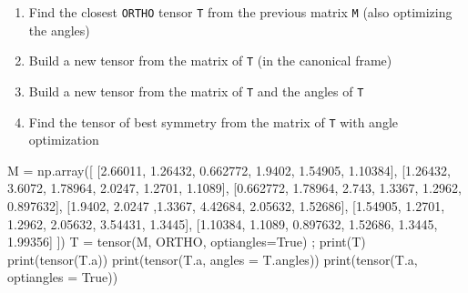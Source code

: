 \documentclass[
  letterpaper,
  DIV=11,
  numbers=noendperiod]{scrreprt}
\newenvironment{Shaded}{\begin{snugshade}}{\end{snugshade}}
\newcommand{\BuiltInTok}[1]{\textcolor[rgb]{0.00,0.23,0.31}{#1}}
\newcommand{\FloatTok}[1]{\textcolor[rgb]{0.68,0.00,0.00}{#1}}
\newcommand{\NormalTok}[1]{\textcolor[rgb]{0.00,0.23,0.31}{#1}}
\newcommand{\OperatorTok}[1]{\textcolor[rgb]{0.37,0.37,0.37}{#1}}
\newcommand{\VariableTok}[1]{\textcolor[rgb]{0.07,0.07,0.07}{#1}}
\begin{document}
\begin{tcolorbox}[enhanced jigsaw, left=2mm, bottomrule=.15mm, colbacktitle=quarto-callout-caution-color!10!white, colback=white, colframe=quarto-callout-caution-color-frame, rightrule=.15mm, bottomtitle=1mm, toptitle=1mm, titlerule=0mm, title={Exercise}, toprule=.15mm, arc=.35mm, opacityback=0, opacitybacktitle=0.6, leftrule=.75mm, breakable, coltitle=black]

\begin{enumerate}
\def\labelenumi{\arabic{enumi}.}
\item
  Find the closest \texttt{ORTHO} tensor \texttt{T} from the previous
  matrix \texttt{M} (also optimizing the angles)
\item
  Build a new tensor from the matrix of \texttt{T} (in the canonical
  frame)
\item
  Build a new tensor from the matrix of \texttt{T} and the angles of
  \texttt{T}
\item
  Find the tensor of best symmetry from the matrix of \texttt{T} with
  angle optimization
\end{enumerate}

\begin{Shaded}
\begin{Highlighting}[]
\NormalTok{M }\OperatorTok{=}\NormalTok{ np.array([ [}\FloatTok{2.66011}\NormalTok{, }\FloatTok{1.26432}\NormalTok{, }\FloatTok{0.662772}\NormalTok{, }\FloatTok{1.9402}\NormalTok{, }\FloatTok{1.54905}\NormalTok{, }\FloatTok{1.10384}\NormalTok{],}
\NormalTok{               [}\FloatTok{1.26432}\NormalTok{, }\FloatTok{3.6072}\NormalTok{, }\FloatTok{1.78964}\NormalTok{, }\FloatTok{2.0247}\NormalTok{, }\FloatTok{1.2701}\NormalTok{, }\FloatTok{1.1089}\NormalTok{], }
\NormalTok{               [}\FloatTok{0.662772}\NormalTok{, }\FloatTok{1.78964}\NormalTok{, }\FloatTok{2.743}\NormalTok{, }\FloatTok{1.3367}\NormalTok{, }\FloatTok{1.2962}\NormalTok{, }\FloatTok{0.897632}\NormalTok{], }
\NormalTok{               [}\FloatTok{1.9402}\NormalTok{, }\FloatTok{2.0247}\NormalTok{ ,}\FloatTok{1.3367}\NormalTok{, }\FloatTok{4.42684}\NormalTok{, }\FloatTok{2.05632}\NormalTok{, }\FloatTok{1.52686}\NormalTok{], }
\NormalTok{               [}\FloatTok{1.54905}\NormalTok{, }\FloatTok{1.2701}\NormalTok{, }\FloatTok{1.2962}\NormalTok{, }\FloatTok{2.05632}\NormalTok{, }\FloatTok{3.54431}\NormalTok{, }\FloatTok{1.3445}\NormalTok{], }
\NormalTok{               [}\FloatTok{1.10384}\NormalTok{, }\FloatTok{1.1089}\NormalTok{, }\FloatTok{0.897632}\NormalTok{, }\FloatTok{1.52686}\NormalTok{, }\FloatTok{1.3445}\NormalTok{, }\FloatTok{1.99356}\NormalTok{] ])}
\NormalTok{T }\OperatorTok{=}\NormalTok{ tensor(M, ORTHO, optiangles}\OperatorTok{=}\VariableTok{True}\NormalTok{) }\OperatorTok{;} \BuiltInTok{print}\NormalTok{(T)}
\BuiltInTok{print}\NormalTok{(tensor(T.a))}
\BuiltInTok{print}\NormalTok{(tensor(T.a, angles }\OperatorTok{=}\NormalTok{ T.angles))}
\BuiltInTok{print}\NormalTok{(tensor(T.a, optiangles }\OperatorTok{=} \VariableTok{True}\NormalTok{))}
\end{Highlighting}
\end{Shaded}


\end{tcolorbox}
\end{document}
